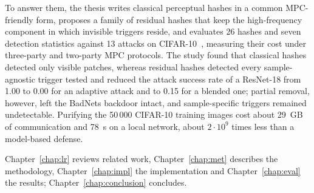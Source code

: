 To answer them, the thesis writes classical perceptual hashes in a common
MPC-friendly form, proposes a family of residual hashes that keep the
high-frequency component in which invisible triggers reside, and evaluates
26 hashes and seven detection statistics against 13 attacks on
CIFAR-10~\cite{krizhevsky2009cifar}, measuring their cost under three-party and
two-party MPC protocols. The study found that classical hashes detected only visible patches,
whereas residual hashes detected every sample-agnostic trigger tested and
reduced the attack success rate of a ResNet-18 from 1.00 to 0.00 for an adaptive
attack and to 0.15 for a blended one; partial removal, however, left the BadNets
backdoor intact, and sample-specific triggers remained undetectable. Purifying
the 50\,000 CIFAR-10 training images cost about 29~GB of communication and 78~s
on a local network, about $2\cdot10^{9}$ times less than a model-based defense.

Chapter~\ref{chap:lr} reviews related work, Chapter~\ref{chap:met} describes
the methodology, Chapter~\ref{chap:impl} the implementation and
Chapter~\ref{chap:eval} the results; Chapter~\ref{chap:conclusion} concludes.
